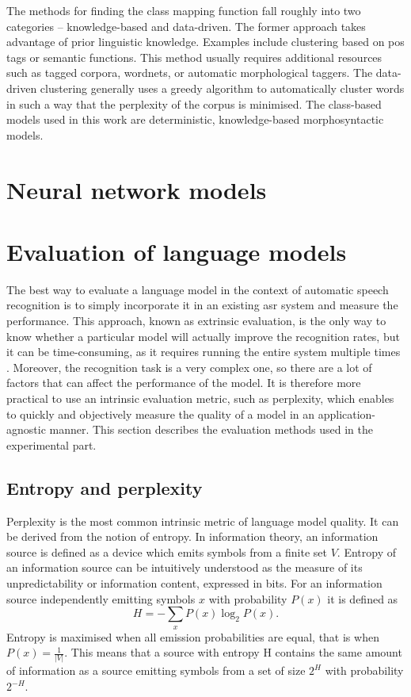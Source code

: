 	The methods for finding the class mapping function fall roughly into two categories -- knowledge-based and data-driven. The former approach takes advantage of prior linguistic knowledge. Examples include clustering based on \gls{pos} tags or semantic functions. This method usually requires additional resources such as tagged corpora, wordnets, or automatic morphological taggers. The data-driven clustering generally uses a greedy algorithm to automatically cluster words in such a way that the perplexity of the corpus is minimised. The class-based models used in this work are deterministic, knowledge-based morphosyntactic models.
	\section{Neural network models}
	\label{section:rnn}
	\section{Evaluation of language models}
	\label{section:evaluation}
	The best way to evaluate a language model in the context of automatic speech recognition is to simply incorporate it in an existing \gls{asr} system and measure the performance. This approach, known as extrinsic evaluation, is the only way to know whether a particular model will actually improve the recognition rates, but it can be time-consuming, as it requires running the entire system multiple times \cite{jurafsky2000speech}. Moreover, the recognition task is a very complex one, so there are a lot of factors that can affect the performance of the model. It is therefore more practical to use an intrinsic evaluation metric, such as perplexity, which enables to quickly and objectively measure the quality of a model in an application-agnostic manner. This section describes the evaluation methods used in the experimental part.
	\subsection{Entropy and perplexity}
	\label{subsection:perplexity}
	Perplexity is the most common intrinsic metric of language model quality. It can be derived from the notion of entropy. In information theory, an information source is defined as a device which emits symbols from a finite set $V$. Entropy of an information source can be intuitively understood as the measure of its unpredictability or information content, expressed in bits. For an information source independently emitting symbols $x$ with probability $P(x)$ it is defined as
	\begin{equation}
		H=-\sum_{x}P(x)\log_{2}P(x).
		\label{equation:entropy}
	\end{equation}
	Entropy is maximised when all emission probabilities are equal, that is when $P(x)=\frac{1}{|V|}$. This means that a source with entropy H contains the same amount of information as a source emitting symbols from a set of size $2^{H}$ with probability $2^{-H}$.

